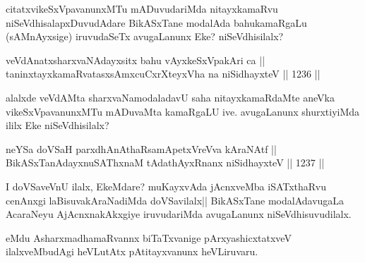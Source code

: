 \begin{artha}
citatxvikeSxVpavanunxMTu mADuvudariMda nitayxkamaRvu niSeVdhisalapxDuvudAdare BikASxTane modalAda bahukamaRgaLu (sAMnAyxsige) iruvudaSeTx avugaLanunx Eke? niSeVdhisilalx?
\end{artha}

\begin{shl}
veVdAnatxsharxvaNAdayxsitx bahu vAyxkeSxVpakAri ca ||  \\
taninxtayxkamaRvatasxsAmxcuCxrXteyxVha na niSidhayxteV \hfill || 1236 ||  
\end{shl}

\begin{artha}
alalxde veVdAMta sharxvaNamodaladavU saha nitayxkamaRdaMte aneVka vikeSxVpavanunxMTu mADuvaMta kamaRgaLU ive. avugaLanunx shurxtiyiMda ililx Eke niSeVdhisilalx?
\end{artha}


\begin{shl}
neYSa doVSaH \footnotemark[3]parxdhAnAthaRsamApetxVreVva kAraNAtf || \\
BikASxTanAdayxnuSAThxnaM tAdathAyxRnanx niSidhayxteV \hfill || 1237 ||  
\end{shl}

\begin{artha}
I doVSaveVnU ilalx, EkeMdare? muKayxvAda jAcnxveMba iSATxthaRvu cenAnxgi laBisuvakAraNadiMda doVSavilalx|| BikASxTane modalAdavugaLa AcaraNeyu AjAcnxnakAkxgiye iruvudariMda avugaLanunx niSeVdhisuvudilalx.
\end{artha}

\begin{artha}
eMdu AsharxmadhamaRvannx biTaTxvanige pArxyashicxtatxveV ilalxveMbudAgi heVLutAtx pAtitayxvanunx heVLiruvaru.
\end{artha}

